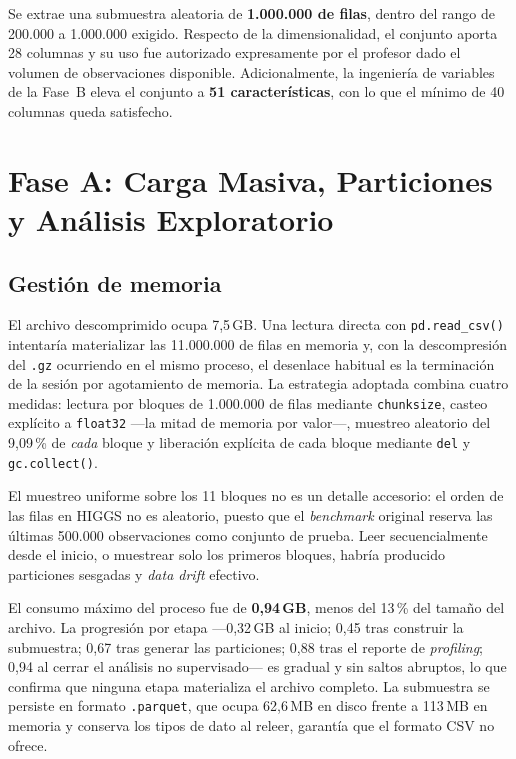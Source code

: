 \documentclass[12pt,a4paper]{article}
\begin{document}
Se extrae una submuestra aleatoria de \textbf{1.000.000 de filas}, dentro del rango de 200.000 a
1.000.000 exigido. Respecto de la dimensionalidad, el conjunto aporta 28 columnas y su uso fue
autorizado expresamente por el profesor dado el volumen de observaciones disponible.
Adicionalmente, la ingeniería de variables de la Fase~B eleva el conjunto a \textbf{51
características}, con lo que el mínimo de 40 columnas queda satisfecho.

\section{Fase A: Carga Masiva, Particiones y Análisis Exploratorio}

\subsection{Gestión de memoria}

El archivo descomprimido ocupa 7,5\,GB. Una lectura directa con \texttt{pd.read\_csv()} intentaría
materializar las 11.000.000 de filas en memoria y, con la descompresión del \texttt{.gz}
ocurriendo en el mismo proceso, el desenlace habitual es la terminación de la sesión por
agotamiento de memoria. La estrategia adoptada combina cuatro medidas: lectura por bloques de
1.000.000 de filas mediante \texttt{chunksize}, casteo explícito a \texttt{float32} ---la mitad de
memoria por valor---, muestreo aleatorio del 9,09\,\% de \emph{cada} bloque y liberación explícita
de cada bloque mediante \texttt{del} y \texttt{gc.collect()}.

El muestreo uniforme sobre los 11 bloques no es un detalle accesorio: el orden de las filas en
HIGGS no es aleatorio, puesto que el \emph{benchmark} original reserva las últimas 500.000
observaciones como conjunto de prueba. Leer secuencialmente desde el inicio, o muestrear solo los
primeros bloques, habría producido particiones sesgadas y \emph{data drift} efectivo.

El consumo máximo del proceso fue de \textbf{0,94\,GB}, menos del 13\,\% del tamaño del archivo.
La progresión por etapa ---0,32\,GB al inicio; 0,45 tras construir la submuestra; 0,67 tras generar
las particiones; 0,88 tras el reporte de \emph{profiling}; 0,94 al cerrar el análisis no
supervisado--- es gradual y sin saltos abruptos, lo que confirma que ninguna etapa materializa el
archivo completo. La submuestra se persiste en formato \texttt{.parquet}, que ocupa 62,6\,MB en
disco frente a 113\,MB en memoria y conserva los tipos de dato al releer, garantía que el formato
CSV no ofrece.
\end{document}
